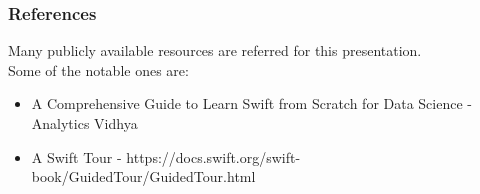 \begin{frame}\frametitle{References}
Many publicly available resources are referred for this presentation. \\

\scriptsize
Some of the notable ones are:
\begin{itemize}
\item A Comprehensive Guide to Learn Swift from Scratch for Data Science - Analytics Vidhya
\item A Swift Tour - https://docs.swift.org/swift-book/GuidedTour/GuidedTour.html
\end{itemize}
\end{frame}
